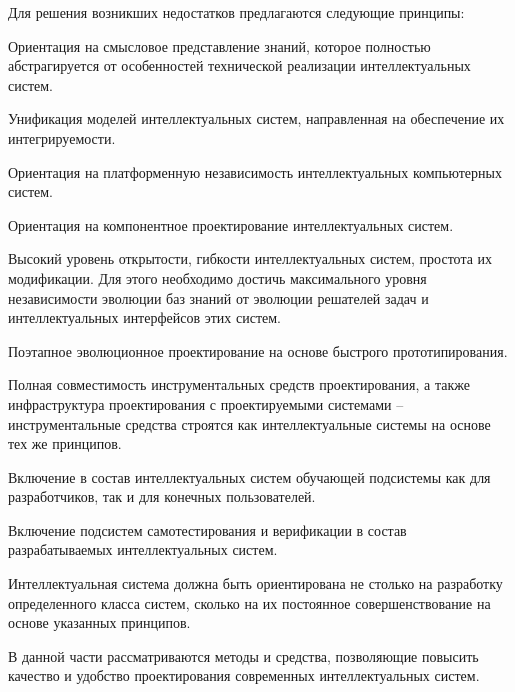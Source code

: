 \begin{partbacktext}
Для решения возникших недостатков предлагаются следующие принципы:
\begin{textitemize}
	\item{Ориентация на смысловое представление знаний, которое полностью абстрагируется от
		особенностей технической реализации интеллектуальных систем.}
	\item{Унификация моделей интеллектуальных систем, направленная на обеспечение их
		интегрируемости.}
	\item{Ориентация на платформенную независимость интеллектуальных компьютерных систем.}
	\item{Ориентация на компонентное проектирование интеллектуальных систем.}
	\item{Высокий уровень открытости, гибкости интеллектуальных систем, простота их модификации. Для этого необходимо достичь максимального уровня независимости эволюции баз знаний от эволюции решателей задач и интеллектуальных интерфейсов этих систем.}
	\item{Поэтапное эволюционное проектирование на основе быстрого прототипирования.}
	\item{Полная совместимость инструментальных средств проектирования, а также инфраструктура проектирования с проектируемыми системами – инструментальные средства строятся как интеллектуальные системы на основе тех же принципов.}
	\item{Включение в состав интеллектуальных систем обучающей подсистемы как для разработчиков, так и для конечных пользователей.}
	\item{Включение подсистем самотестирования и верификации в состав разрабатываемых интеллектуальных систем.}
\end{textitemize}

Интеллектуальная система должна быть ориентирована не столько на разработку определенного класса систем, сколько на их постоянное совершенствование  на основе указанных принципов.

В данной части рассматриваются методы и средства, позволяющие повысить качество и удобство проектирования современных интеллектуальных систем.
\end{partbacktext}




